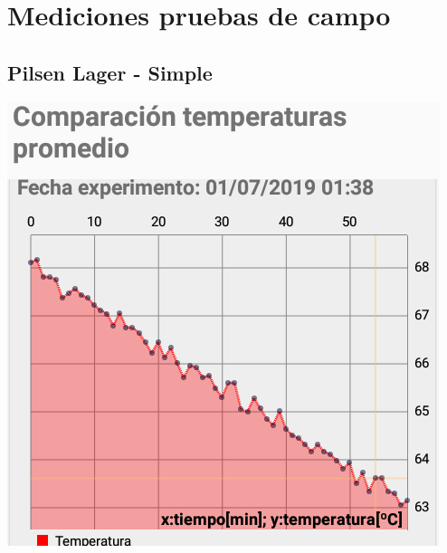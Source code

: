 \chapter{Mediciones pruebas de campo}
    \label{GraficasPruebasCampo}
    \begin{minipage}{\textwidth}
    \section{Pilsen Lager - Simple}
                \centering
                \includegraphics[scale=0.65]{Pruebas/SimpleExp1.jpg}
                \label{fig:SimpTempExp1}
    \end{minipage}     
